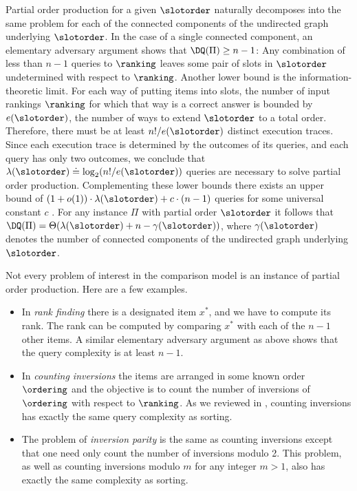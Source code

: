 \documentclass{toc}
\begin{document}
Partial order production for a given $\slotorder$ naturally decomposes into the same problem for each of the connected components of the undirected graph underlying $\slotorder$. In the case of a single connected component, an elementary adversary argument shows that $\DQ(\Pi) \ge n-1$: Any combination of less than $n-1$ queries to $\ranking$ leaves some pair of slots in $\slotorder$ undetermined with respect to $\ranking$. Another lower bound is the information-theoretic limit. For each way of putting items into slots, the number of input rankings $\ranking$ for which that way is a correct answer is bounded by $e(\slotorder)$, the number of ways to extend $\slotorder$ to a total order. Therefore, there must be at least $n!/e(\slotorder)$ distinct execution traces. Since each execution trace is determined by the outcomes of its queries, and each query has only two outcomes, we conclude that $\lambda(\slotorder) \doteq \log_2(n!/e(\slotorder))$ queries are necessary to solve partial order production. Complementing these lower bounds there exists an upper bound of $(1 + o(1))\cdot \lambda(\slotorder) + c \cdot (n-1)$ queries for some universal constant $c$ \cite{CFJJM2008}. For any
%
instance $\Pi$ with partial order $\slotorder$ it follows that $\DQ(\Pi)= \Theta(\lambda(\slotorder) + n - \gamma(\slotorder))$, where $\gamma(\slotorder)$ denotes the number of connected components of the undirected graph underlying $\slotorder$. 

Not every problem of interest in the comparison model is an instance of partial order production. Here are a few examples.
\begin{itemize}
\item In \emph{rank finding} there is a designated item $x^*$, and we have to compute its rank. The rank can be computed by comparing $x^*$ with each of the $n-1$ other items. A similar elementary adversary argument as above shows that the query complexity is at least $n-1$.
\item In \emph{counting inversions} the items are arranged in some known order $\ordering$ and the objective is to count the number of inversions of $\ordering$ with respect to $\ranking$. As we reviewed in , counting inversions has exactly the same query complexity as sorting.
\item The problem of \emph{inversion parity} is the same as counting inversions except that one need only count the number of inversions modulo 2. This problem, as well as counting inversions modulo $m$ for any integer $m > 1$, also has exactly the same complexity as sorting.
\end{itemize}
\end{document}
